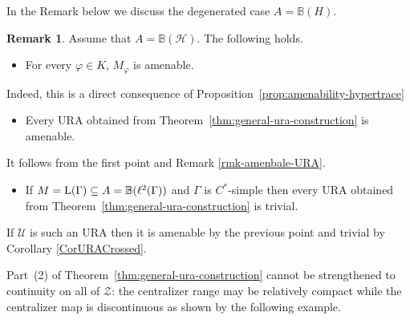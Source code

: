 \documentclass[12pt]{amsart} %
\theoremstyle{plain}
\theoremstyle{definition}
\newtheorem{remark}[theorem]{Remark}
\newcommand{\B}{\mathbb{B}}
\newcommand{\LL}{{\rm L}}
\newcommand{\Ucal}{\mathcal{U}}
\begin{document}
\noindent In the Remark below we discuss the degenerated case $A=\B(H)$.
\begin{remark}\label{rmk:maximal-test-algebra-amenable-ura}
Assume that $A=\mathbb B(\mathcal H)$. The following holds.
\begin{itemize}
\item For every $\varphi\in K$, $M_\varphi$ is amenable.
\end{itemize}
Indeed, this is a direct consequence of Proposition~\ref{prop:amenability-hypertrace}
\begin{itemize}
\item Every URA obtained from Theorem~\ref{thm:general-ura-construction} is amenable.
\end{itemize}
It follows from the first point and Remark \ref{rmk-amenbale-URA}.
\begin{itemize}
\item If $M=\LL(\Gamma)\subseteq A=\mathbb B(\ell^2(\Gamma))$ and $\Gamma$ is
$C^*$-simple then every URA obtained from Theorem~\ref{thm:general-ura-construction} is trivial.
\end{itemize}
If $\Ucal$ is such an URA then it is amenable by the previous point and trivial by Corollary \ref{CorURACrossed}.
\end{remark}
\noindent Part~{\rm(2)} of
Theorem~\ref{thm:general-ura-construction} cannot be strengthened to
continuity on all of $\mathcal Z$: the centralizer range may be relatively
compact while the centralizer map is discontinuous as shown by the following example.
\end{document}

